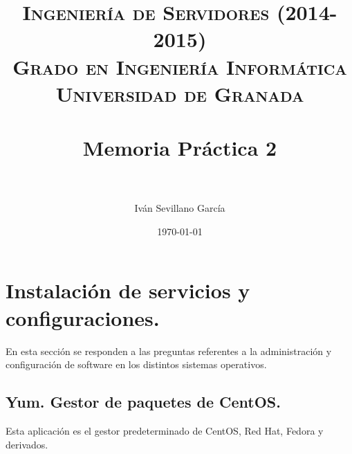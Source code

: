 

\title{	
	\normalfont \normalsize 
	\textsc{{\bf Ingeniería de Servidores (2014-2015)} \\ Grado en Ingeniería Informática \\ Universidad de Granada} \\ [25pt] %
	\horrule{0.5pt} \\[0.4cm] %
	\huge Memoria Práctica 2 \\ %
	\horrule{2pt} \\[0.5cm] %
}

\author{Iván Sevillano García} %

\date{\normalsize\today} %



\maketitle %

\newpage %

\tableofcontents %

\newpage

\section{Instalación de servicios y configuraciones.}
En esta sección se responden a las preguntas referentes a la administración y configuración de software en los distintos sistemas operativos.
\subsection{Yum. Gestor de paquetes de CentOS.}

Esta aplicación es el gestor predeterminado de CentOS, Red Hat, Fedora y derivados.

